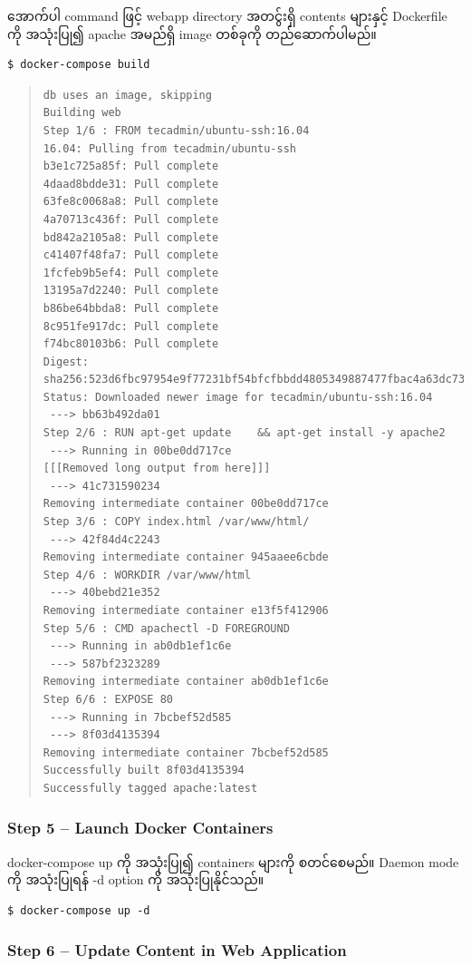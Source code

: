 \documentclass[]{article}
\begin{document}
အောက်ပါ command ဖြင့် webapp directory အတင်ွးရှိ contents များနှင့်
Dockerfile ကို အသုံးပြု၍ apache အမည်ရှိ image တစ်ခုကို တည်ဆောက်ပါမည်။

\begin{verbatim}
$ docker-compose build
\end{verbatim}

\begin{quote}
\begin{verbatim}
db uses an image, skipping
Building web
Step 1/6 : FROM tecadmin/ubuntu-ssh:16.04
16.04: Pulling from tecadmin/ubuntu-ssh
b3e1c725a85f: Pull complete
4daad8bdde31: Pull complete
63fe8c0068a8: Pull complete
4a70713c436f: Pull complete
bd842a2105a8: Pull complete
c41407f48fa7: Pull complete
1fcfeb9b5ef4: Pull complete
13195a7d2240: Pull complete
b86be64bbda8: Pull complete
8c951fe917dc: Pull complete
f74bc80103b6: Pull complete
Digest: sha256:523d6fbc97954e9f77231bf54bfcfbbdd4805349887477fbac4a63dc735d777d
Status: Downloaded newer image for tecadmin/ubuntu-ssh:16.04
 ---> bb63b492da01
Step 2/6 : RUN apt-get update    && apt-get install -y apache2
 ---> Running in 00be0dd717ce
[[[Removed long output from here]]]
 ---> 41c731590234
Removing intermediate container 00be0dd717ce
Step 3/6 : COPY index.html /var/www/html/
 ---> 42f84d4c2243
Removing intermediate container 945aaee6cbde
Step 4/6 : WORKDIR /var/www/html
 ---> 40bebd21e352
Removing intermediate container e13f5f412906
Step 5/6 : CMD apachectl -D FOREGROUND
 ---> Running in ab0db1ef1c6e
 ---> 587bf2323289
Removing intermediate container ab0db1ef1c6e
Step 6/6 : EXPOSE 80
 ---> Running in 7bcbef52d585
 ---> 8f03d4135394
Removing intermediate container 7bcbef52d585
Successfully built 8f03d4135394
Successfully tagged apache:latest
\end{verbatim}
\end{quote}

\hypertarget{step-5-launch-docker-containers}{%
\subsubsection{Step 5 -- Launch Docker
Containers}\label{step-5-launch-docker-containers}}

docker-compose up ကို အသုံးပြု၍ containers များကို စတင်စေမည်။ Daemon
mode ကို အသုံးပြုရန် -d option ကို အသုံးပြုနိုင်သည်။

\begin{verbatim}
$ docker-compose up -d
\end{verbatim}

\hypertarget{step-6-update-content-in-web-application}{%
\subsubsection{Step 6 -- Update Content in Web Application
}\label{step-6-update-content-in-web-application}}
\end{document}
